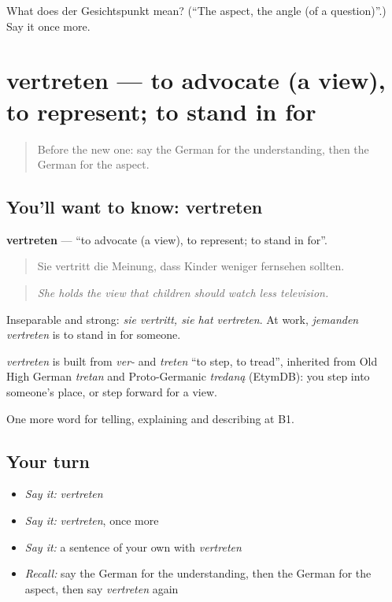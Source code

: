 \begin{tcolorbox}[breakable,colback=teal!4,colframe=teal!35!black,title={Before you move on}]
What does der Gesichtspunkt mean? (\textquotedblleft{}The aspect, the angle (of a question)\textquotedblright{}.) Say it once more.
\end{tcolorbox}
\section[vertreten]{vertreten — to advocate (a view), to represent; to stand in for}

\label{lesson:GE-C330-vertreten}



\begin{quote}
Before the new one: say the German for the understanding, then the German for the aspect.
\end{quote}

\subsection*{You'll want to know: vertreten}
\textbf{vertreten} — \textquotedblleft{}to advocate (a view), to represent; to stand in for\textquotedblright{}.

\begin{quote}
Sie vertritt die Meinung, dass Kinder weniger fernsehen sollten.
\end{quote}

\begin{quote}
\emph{She holds the view that children should watch less television.}
\end{quote}

Inseparable and strong: \emph{sie vertritt, sie hat vertreten}. At work, \emph{jemanden vertreten} is to stand in for someone.

\begin{cousinweb}
\emph{vertreten} is built from \emph{ver-} and \emph{treten} \textquotedblleft{}to step, to tread\textquotedblright{}, inherited from Old High German \emph{tretan} and Proto-Germanic \emph{tredaną} (EtymDB): you step into someone's place, or step forward for a view.
\end{cousinweb}

\begin{grammarlens}[title={What you've built}]
One more word for telling, explaining and describing at B1.
\end{grammarlens}

\subsection*{Your turn}
\begin{itemize}
\raggedright
  \item \emph{Say it:} \emph{vertreten}
  \item \emph{Say it:} \emph{vertreten}, once more
  \item \emph{Say it:} a sentence of your own with \emph{vertreten}
  \item \emph{Recall:} say the German for the understanding, then the German for the aspect, then say \emph{vertreten} again
\end{itemize}

